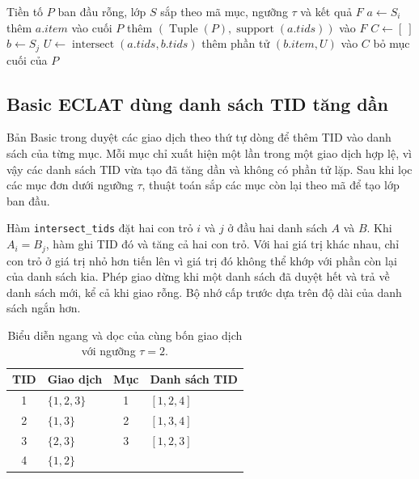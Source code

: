 \begin{algorithm}[tb]
\caption{Duyệt theo chiều sâu và mở rộng tiền tố trong hai bản ECLAT}
\label{alg:dfs}
\begin{algorithmic}[1]
\Require Tiền tố $P$ ban đầu rỗng, lớp $S$ sắp theo mã mục, ngưỡng $\tau$ và kết quả $F$
  \State $a\gets S_i$
  \State thêm $a.item$ vào cuối $P$
  \State thêm $(\operatorname{Tuple}(P),\operatorname{support}(a.tids))$ vào $F$
  \State $C\gets[\ ]$
    \State $b\gets S_j$
    \State $U\gets\operatorname{intersect}(a.tids,b.tids)$
      \State thêm phần tử $(b.item,U)$ vào $C$
    \EndIf
  \EndFor
    \State {}
  \EndIf
  \State bỏ mục cuối của $P$
\EndFor
\EndFunction
\end{algorithmic}
\end{algorithm}

\subsection{Basic ECLAT dùng danh sách TID tăng dần}
Bản Basic trong  duyệt các giao dịch theo
thứ tự dòng để thêm TID vào danh sách của từng mục. Mỗi mục chỉ xuất hiện
một lần trong một giao dịch hợp lệ, vì vậy các danh sách TID vừa tạo đã
tăng dần và không có phần tử lặp. Sau khi lọc các mục đơn dưới ngưỡng
$\tau$, thuật toán sắp các mục còn lại theo mã để tạo lớp ban đầu.

Hàm \texttt{intersect\_tids} đặt hai con trỏ $i$ và $j$ ở đầu hai danh sách
$A$ và $B$. Khi $A_i=B_j$, hàm ghi TID đó và tăng cả hai con trỏ. Với hai
giá trị khác nhau, chỉ con trỏ ở giá trị nhỏ hơn tiến lên vì giá trị đó
không thể khớp với phần còn lại của danh sách kia. Phép giao dừng khi một
danh sách đã duyệt hết và trả về danh sách mới, kể cả khi giao rỗng.
Bộ nhớ cấp trước dựa trên độ dài của danh sách ngắn hơn.

\begin{table}[tb]
\centering
\caption{Biểu diễn ngang và dọc của cùng bốn giao dịch với ngưỡng $\tau=2$.}
\label{tab:trace}
\begin{tabular}{clcl}
\toprule
TID & Giao dịch & Mục & Danh sách TID \\
\midrule
1 & $\{1,2,3\}$ & 1 & $[1,2,4]$ \\
2 & $\{1,3\}$ & 2 & $[1,3,4]$ \\
3 & $\{2,3\}$ & 3 & $[1,2,3]$ \\
4 & $\{1,2\}$ & & \\
\bottomrule
\end{tabular}
\end{table}

